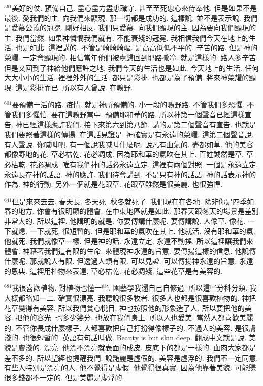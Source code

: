 \documentclass{book}
\begin{document}
$^{561}$美好的仗.
預備自己.
盡心盡力盡忠職守.
甚至至死忠心來侍奉他.
但是如果不是最後.
愛我們的主.
向我們來顯現.
那一切都是成功的.
這樣說.
並不是表示說.
我們是愛慕公義的冠冕.
剛好相反.
我們只愛慕.
向我們顯現的主.
因為要向我們顯現的主.
我們當然.
如果神憐憫我們就有.
不能衰殘的冠冕.
我相信我們今天在地上的生活.
也是如此.
這裡講的.
不管是崎崎崎嶇.
是高高低低不平的.
辛苦的路.
但是神的榮耀.
一定會顯現的.
相信當年他們被虜歸回到耶路撒冷.
就是這樣的.
路人多辛苦.
但是又回到了神給他們應許之地.
我們今天的生活也是如此.
今天地上的生活.
任何大大小小的生活.
裡裡外外的生活.
都只是彩排.
也都是為了預備.
將來神榮耀的顯現.
這是彩排而已.
所以有人曾說.
在曠野.

$^{601}$要預備一活的路.
疫情.
就是神所預備的.
小一段的曠野路.
不管我們多恐懼.
不管我們多懼怕.
要在這曠野當中.
預備耶和華的路.
所以神第一個聲音已經這樣宣告.
神已經這樣應許我們.
接下來第六到第八節.
講的是第二個聲音有宣告.
也就是我們要照著這樣的傳揚.
在這話見證是.
神確實是有永遠的榮耀.
這第二個聲音說.
有人聲說.
你喊叫吧.
有一個說我喊叫什麼呢.
說凡有血氣的.
盡都如草.
他的美容都像野地的花.
草必枯乾.
花必凋成.
因為耶和華的氣吹在其上.
百姓誠然是草.
草必枯乾.
花必凋成.
唯有我們神的話必永遠立定.
這裡有兩個對照.
一個是永遠立定.
永遠長存神的話語.
神的應許.
我們待會講到.
不是只有神的話語.
神的話表示神的作為.
神的行動.
另外一個就是花跟草.
花跟草雖然是很美麗.
也很強悍.

$^{641}$但是來來去去.
春天長.
冬天死.
秋冬就死了.
我們現在在各地.
除非你是四季如春的地方.
你會有很明顯的體會.
在中東地區就是如此.
那春天跟冬天的場景是差別非常大的.
所以這裡.
他講明的就是.
你要傳講什麼呢.
要傳講說.
人像草.
像花.
一下就熄.
一下就死.
很短暫的.
但是耶和華的氣吹在其上.
他就活.
沒有耶和華的氣.
他就死.
我們就像草一樣.
但是神的話.
永遠立定.
永遠不動搖.
所以這裡讓我們來體會.
神藉著我們這有限的生命.
來體現神永遠的旨意.
要傳揚這樣的信息.
他說傳什麼呢.
那就說人有限.
但透過人類有限.
可以見證.
可以傳揚神永遠的旨意.
永遠的恩典.
這裡用植物來表達.
草必枯乾.
花必凋殘.
這些花草是有美容的.

$^{681}$我很喜歡植物.
對植物也懂一些.
園藝學我還自己自修過.
所以這些分科分類.
我大概都略知一二.
確實很漂亮.
我聽說很多牧者.
很多人也都是很喜歡植物的.
神把花草變得有美容.
所以我們賞心悅目.
神也按照他的形象造了人.
所以要把他的美容.
把他的容光.
也多少幾分.
也放在我們身上.
所以人也愛美.
當然人都喜歡美麗的.
不管你長成什麼樣子.
人都喜歡把自己打扮得像樣子的.
不過人的美容.
是很膚淺的.
也很短暫的.
英語有句話叫做.
Beauty is but skin deep.
翻成中文就是說.
美貌是膚淺的.
漂亮.
他漂不漂亮就表面的成皮.
皮底下的都是一樣的.
血肉大家都是差不多的.
所以聖經也提醒我們.
說艷麗是虛假的.
美容是虛浮的.
我們不一定同意.
有些人特別是漂亮的人.
他不覺得是虛假.
他覺得很真實.
因為他靠著美貌.
可能賺很多錢都不一定的.
但是美麗是虛浮的.
\end{document}
